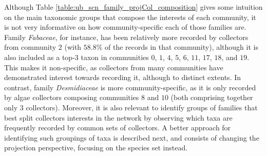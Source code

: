 Although Table \ref{table:ub_scn_family_projCol_composition} gives some intuition on the main taxonomic groups that compose the interests of each community, it is not very informative on how community-specific each of those families are.
Family \textit{Fabaceae}, for instance, has been relatively more recorded by collectors from community $2$ (with $58.8\%$ of the records in that community), although it is also included as a top-3 taxon in communities $0$, $1$, $4$, $5$, $6$, $11$, $17$, $18$, and $19$.
This makes it non-specific, as collectors from many communities have demonstrated interest towards recording it, although to distinct extents.
In contrast, family \textit{Desmidiaceae} is more community-specific, as it is only recorded by algae collectors composing communities $8$ and $10$ (both comprising together only $3$ collectors).
Moreover, it is also relevant to identify groups of families that best split collectors interests in the network by observing which taxa are frequently recorded by common sets of collectors.
A better approach for identifying such groupings of taxa is described next, and consists of changing the projection perspective, focusing on the species set instead.

